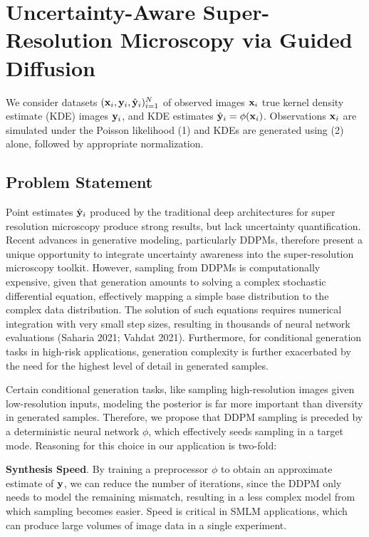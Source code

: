 \documentclass{article}
\begin{document}
\section{Uncertainty-Aware Super-Resolution Microscopy via Guided Diffusion}

We consider datasets $(\bold{x}_i,\bold{y}_i,\hat{\bold{y}}_{i})_{i=1}^{N}$ of observed images $\bold{x}_i$ true kernel density estimate (KDE) images $\bold{y}_{i}$, and KDE estimates $\hat{\bold{y}}_{i}=\phi(\bold{x}_{i})$. Observations $\bold{x}_i$ are simulated under the Poisson likelihood (1) and KDEs are generated using (2) alone, followed by appropriate normalization. 

\subsection{Problem Statement}

Point estimates $\hat{\bold{y}}_{i}$ produced by the traditional deep architectures for super resolution microscopy produce strong results, but lack uncertainty quantification. Recent advances in generative modeling, particularly DDPMs, therefore present a unique opportunity to integrate uncertainty awareness into the super-resolution microscopy toolkit. However, sampling from DDPMs is computationally expensive, given that generation amounts to solving a complex stochastic differential equation, effectively mapping a simple base distribution to the complex data distribution. The solution of such equations requires numerical integration with very small step sizes, resulting in thousands of neural network evaluations (Saharia 2021; Vahdat 2021). Furthermore, for conditional generation tasks in high-risk applications, generation complexity is further exacerbated by the need for the highest level of detail in generated samples.

Certain conditional generation tasks, like sampling high-resolution images given low-resolution inputs, modeling the posterior is far more important than diversity in generated samples. Therefore, we propose that DDPM sampling is preceded by a deterministic neural network $\phi$, which effectively seeds sampling in a target mode. Reasoning for this choice in our application is two-fold:

\textbf{Synthesis Speed}. By training a preprocessor $\phi$ to obtain an approximate estimate of $\bold{y}$, we can reduce the number of iterations, since the DDPM only needs to model the remaining mismatch, resulting in a less complex model from which sampling becomes easier. Speed is critical in SMLM applications, which can produce large volumes of image data in a single experiment.\\
\end{document}

